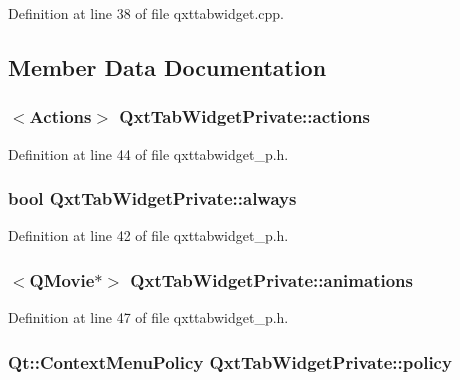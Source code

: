 Definition at line 38 of file qxttabwidget.\-cpp.



\subsection{Member Data Documentation}
\hypertarget{class_qxt_tab_widget_private_a992905f500e6bad95807a882853e0189}{
\subsubsection[{actions}]{$<${\bf Actions}$>$ Qxt\-Tab\-Widget\-Private\-::actions}}\label{class_qxt_tab_widget_private_a992905f500e6bad95807a882853e0189}


Definition at line 44 of file qxttabwidget\-\_\-p.\-h.

\hypertarget{class_qxt_tab_widget_private_aa3f0f38a8199acffb62b94e4b4f505b2}{
\subsubsection[{always}]{\setlength{\rightskip}{0pt plus 5cm}bool Qxt\-Tab\-Widget\-Private\-::always}}\label{class_qxt_tab_widget_private_aa3f0f38a8199acffb62b94e4b4f505b2}


Definition at line 42 of file qxttabwidget\-\_\-p.\-h.

\hypertarget{class_qxt_tab_widget_private_aacbbb74213ffde0c6f6f00dec7b62d03}{
\subsubsection[{animations}]{$<$Q\-Movie$\ast$$>$ Qxt\-Tab\-Widget\-Private\-::animations}}\label{class_qxt_tab_widget_private_aacbbb74213ffde0c6f6f00dec7b62d03}


Definition at line 47 of file qxttabwidget\-\_\-p.\-h.

\hypertarget{class_qxt_tab_widget_private_a60d14c7d6c25035845d3d5439f9bf936}{
\subsubsection[{policy}]{\setlength{\rightskip}{0pt plus 5cm}Qt\-::\-Context\-Menu\-Policy Qxt\-Tab\-Widget\-Private\-::policy}}\label{class_qxt_tab_widget_private_a60d14c7d6c25035845d3d5439f9bf936}


